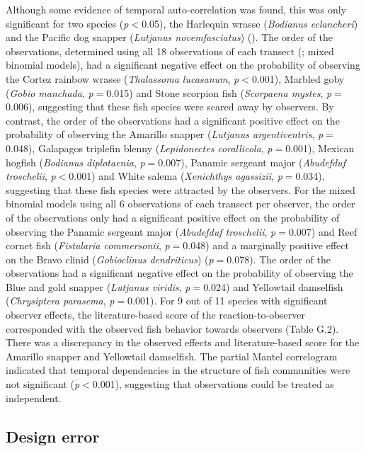 \documentclass[10pt,letterpaper]{article}
\begin{document}
Although some evidence of temporal auto-correlation was found, this was only significant for two species (\textit{p}$<$0.05), the Harlequin wrasse (\textit{Bodianus eclancheri}) and the Pacific dog snapper (\textit{Lutjanus novemfasciatus}) (). The order of the observations, determined using all 18 observations of each transect (; mixed binomial models), had a significant negative effect on the probability of observing the Cortez rainbow wrasse (\textit{Thalassoma lucasanum}, \textit{p}$<$0.001), Marbled goby (\textit{Gobio manchada},  \textit{p}$=$0.015) and Stone scorpion fish (\textit{Scorpaena mystes},  \textit{p}$=$0.006), suggesting that these fish species were scared away by observers. By contrast, the order of the observations had a significant positive effect on the probability of observing the Amarillo snapper (\textit{Lutjanus argentiventris}, \textit{p}$=$0.048), Galapagos triplefin blenny (\textit{Lepidonectes corallicola}, \textit{p}$=$0.001), Mexican hogfish (\textit{Bodianus diplotaenia}, \textit{p}$=$0.007), Panamic sergeant major (\textit{Abudefduf troschelii}, \textit{p}$<$0.001) and White salema (\textit{Xenichthys agassizii}, \textit{p}$=$0.034), suggesting that these fish species were attracted by the observers. For the mixed binomial models using all 6 observations of each transect per observer, the order of the observations only had a significant positive effect on the probability of observing the Panamic sergeant major (\textit{Abudefduf troschelii}, \textit{p}$=$0.007) and Reef cornet fish (\textit{Fistularia commersonii}, \textit{p}$=$0.048) and a marginally positive effect on the Bravo clinid (\textit{Gobioclinus dendriticus}) (\textit{p}$=$0.078). The order of the observations had a significant negative effect on the probability of observing the Blue and gold snapper (\textit{Lutjanus viridis}, \textit{p}$=$0.024) and Yellowtail damselfish (\textit{Chrysiptera parasema}, \textit{p}$=$0.001). For 9 out of 11 species with significant observer effects, the literature-based score of the reaction-to-observer corresponded with the observed fish behavior towards observers (Table G.2). There was a discrepancy in the observed effects and literature-based score for the Amarillo snapper and Yellowtail damselfish. The partial Mantel correlogram indicated that temporal dependencies in the structure of fish communities were not significant (\textit{p}$<$0.001), suggesting that observations could be treated as independent. 

\subsection{Design error}
\end{document}
